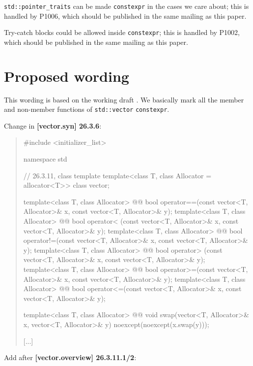 \documentclass{wg21}
\newcommand{\cc}[1]{\texttt{#1}}
\begin{document}
\cc{std::pointer_traits} can be made \cc{constexpr} in the cases we care about;
this is handled by P1006, which should be published in the same mailing as this
paper.

Try-catch blocks could be allowed inside \cc{constexpr}; this is handled by
P1002, which should be published in the same mailing as this paper.


\section{Proposed wording}
This wording is based on the working draft \cite{N4727}. We basically mark
all the member and non-member functions of \cc{std::vector} \cc{constexpr}.

Change in \textbf{[vector.syn] 26.3.6}:
\begin{quote}
\begin{codeblock}
#include <initializer_list>

namespace std {
  // 26.3.11, class template 
  template<class T, class Allocator = allocator<T>> class vector;

  template<class T, class Allocator>
    @@ bool operator==(const vector<T, Allocator>& x, const vector<T, Allocator>& y);
  template<class T, class Allocator>
    @@ bool operator< (const vector<T, Allocator>& x, const vector<T, Allocator>& y);
  template<class T, class Allocator>
    @@ bool operator!=(const vector<T, Allocator>& x, const vector<T, Allocator>& y);
  template<class T, class Allocator>
    @@ bool operator> (const vector<T, Allocator>& x, const vector<T, Allocator>& y);
  template<class T, class Allocator>
    @@ bool operator>=(const vector<T, Allocator>& x, const vector<T, Allocator>& y);
  template<class T, class Allocator>
    @@ bool operator<=(const vector<T, Allocator>& x, const vector<T, Allocator>& y);

  template<class T, class Allocator>
    @@ void swap(vector<T, Allocator>& x, vector<T, Allocator>& y)
      noexcept(noexcept(x.swap(y)));

  [...]
}
\end{codeblock}
\end{quote}

Add after \textbf{[vector.overview] 26.3.11.1/2}:
\begin{quote}
\end{quote}
\end{document}
